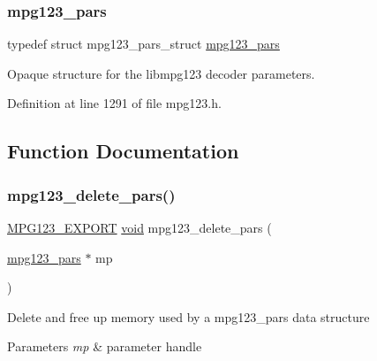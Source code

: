 \subsubsection{\texorpdfstring{mpg123\_pars}{mpg123\_pars}}
{\footnotesize\ttfamily typedef struct mpg123\+\_\+pars\+\_\+struct \mbox{\hyperlink{group__mpg123__advpar_ga3983578625af3bb6dc7e3b74d0cab4aa}{mpg123\+\_\+pars}}}

Opaque structure for the libmpg123 decoder parameters. 

Definition at line 1291 of file mpg123.\+h.



\subsection{Function Documentation}
\mbox{\label{group__mpg123__advpar_gaafc74d249a5a7a545cc6e11576ec5c78}} 
\subsubsection{\texorpdfstring{mpg123\_delete\_pars()}{mpg123\_delete\_pars()}}
{\footnotesize\ttfamily \mbox{\hyperlink{mpg123_8h_a2ba98cfba3f760879df70e755b2a61cc}{M\+P\+G123\+\_\+\+E\+X\+P\+O\+RT}} \mbox{\hyperlink{_s_d_l__opengles2__gl2ext_8h_ae5d8fa23ad07c48bb609509eae494c95}{void}} mpg123\+\_\+delete\+\_\+pars (\begin{DoxyParamCaption}\item[{\mbox{\hyperlink{group__mpg123__advpar_ga3983578625af3bb6dc7e3b74d0cab4aa}{mpg123\+\_\+pars}} $\ast$}]{mp }\end{DoxyParamCaption})}

Delete and free up memory used by a mpg123\+\_\+pars data structure 
\begin{DoxyParams}{Parameters}
{\em mp} & parameter handle \\
\hline
\end{DoxyParams}
\mbox{\label{group__mpg123__advpar_ga481219fd8962c7b7ab69d4c8daebc094}} 
